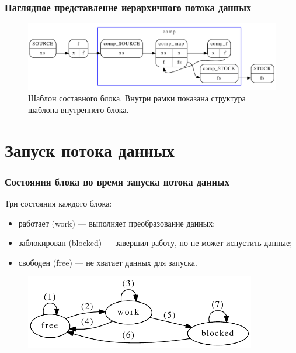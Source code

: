 \documentclass[10pt,pdf,hyperref={unicode}]{beamer}
\begin{document}
\begin{frame}
  \frametitle{Наглядное представление иерархичного потока данных}
  \begin{figure}[H]
    \centering
    \includegraphics[width=\textwidth]{cc_cg.pdf}
    \caption{Шаблон составного блока. Внутри рамки показана структура шаблона внутреннего блока.}
    \label{example:supercomposite}
  \end{figure}
\end{frame}

\section{Запуск потока данных}

\begin{frame}
  \frametitle{Состояния блока во время запуска потока данных}
  Три состояния каждого блока:
  \begin{itemize}
    \item работает (work) --- выполняет преобразование данных;
    \item заблокирован (blocked) --- завершил работу, но не может испустить данные;
    \item свободен (free) --- не хватает данных для запуска.
  \end{itemize}
  
  \begin{figure}[H]
    \centering
    \includegraphics[width=0.9\textwidth]{rules.pdf}
  \end{figure}
\end{frame}
\end{document}
